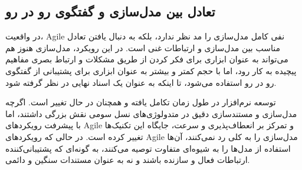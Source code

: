 \subsection*{تعادل بین مدل‌سازی و گفتگوی رو در رو}
در واقعیت، Agile نفی کامل مدل‌سازی را مد نظر ندارد، بلکه به دنبال یافتن تعادل مناسب بین مدل‌سازی و ارتباطات غنی است. در این رویکرد، مدل‌سازی هنوز هم می‌تواند به عنوان ابزاری برای فکر کردن از طریق مشکلات و ارتباط بصری مفاهیم پیچیده به کار رود، اما با حجم کمتر و بیشتر به عنوان ابزاری برای پشتیبانی از گفتگوی رو در رو استفاده می‌شود، تا اینکه به عنوان یک اسناد نهایی در نظر گرفته شود.

توسعه نرم‌افزار در طول زمان تکامل یافته و همچنان در حال تغییر است. اگرچه مدل‌سازی و مستندسازی دقیق در متدولوژی‌های نسل سومی نقش بزرگی داشتند، اما با پیشرفت رویکردهای Agile و تمرکز بر انعطاف‌پذیری و سرعت، جایگاه این تکنیک‌ها تغییر کرده است. در حالی که رویکردهای Agile مدل‌سازی را به کلی رد نمی‌کنند، آن‌ها استفاده از مدل‌ها را به شیوه‌ای متفاوت توصیه می‌کنند، به گونه‌ای که پشتیبانی‌کننده ارتباطات فعال و سازنده باشند و نه به عنوان مستندات سنگین و دائمی.
